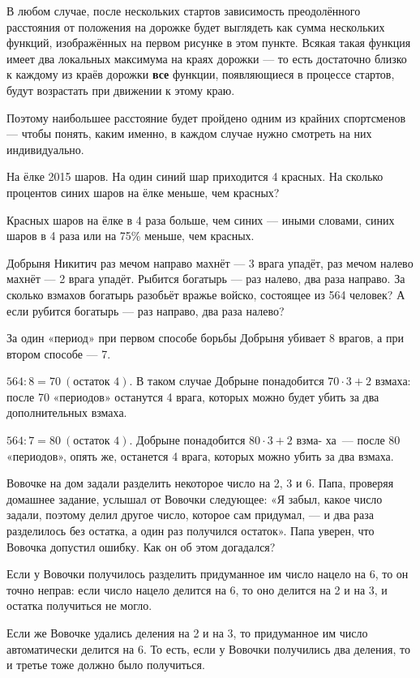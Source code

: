 \begin{itemize}
	В любом случае, после нескольких стартов зависимость преодолённого расстояния от положения на дорожке будет выглядеть как сумма нескольких функций, изображённых на первом рисунке в этом пункте. Всякая такая функция имеет два локальных максимума на краях дорожки — то есть достаточно близко к каждому из краёв дорожки {\bfseries все} функции, появляющиеся в процессе стартов, будут возрастать при движении к этому краю.
	
	Поэтому наибольшее расстояние будет пройдено одним из крайних спортсменов — чтобы понять, каким именно, в каждом случае нужно смотреть на них индивидуально.

\end{itemize}


\begin{itemize}

	\itA На ёлке 2015 шаров. На один синий шар приходится 4 красных. На сколько процентов синих шаров на ёлке меньше, чем красных?
	
	\itr Красных шаров на ёлке в 4 раза больше, чем синих — иными словами, синих шаров в 4 раза или на 75\% меньше, чем красных.

	\itB Добрыня Никитич раз мечом направо махнёт — 3 врага упадёт, раз мечом налево махнёт — 2 врага упадёт. Рыбится богатырь — раз налево, два раза направо. За сколько взмахов богатырь разобьёт вражье войско, состоящее из 564 человек? А если рубится богатырь — раз направо, два раза налево?
	
	\itr За один «период» при первом способе борьбы Добрыня убивает 8 врагов, а при втором способе — 7.
	
	\subitem $564 : 8 = 70\ (\text{остаток\ } 4)$. В таком случае Добрыне понадобится $70 \cdot 3 + 2$ взмаха: после 70 «периодов» останутся 4 врага, которых можно будет убить за два дополнительных взмаха.
	
	\subitem $564 : 7 = 80\ (\text{остаток\ } 4)$. Добрыне понадобится $80 \cdot 3 + 2$ взма- ха~— после 80 «периодов», опять же, останется 4 врага, которых \linebreak можно убить за два взмаха.
	
	\itC Вовочке на дом задали разделить некоторое число на 2, 3 и 6. Папа, проверяя домашнее задание, услышал от Вовочки следующее: «Я забыл, какое число задали, поэтому делил другое число, которое сам придумал, — и два раза разделилось без остатка, а один раз получился остаток». Папа уверен, что Вовочка допустил ошибку. Как он об этом догадался?
	
	\itr Если у Вовочки получилось разделить придуманное им число нацело на 6, то он точно неправ: если число нацело делится на 6, то оно делится на 2 и на 3, и остатка получиться не могло.
	
	Если же Вовочке удались деления на 2 и на 3, то придуманное им число автоматически делится на 6. То есть, если у Вовочки получились два деления, то и третье тоже должно было получиться.

\end{itemize}

